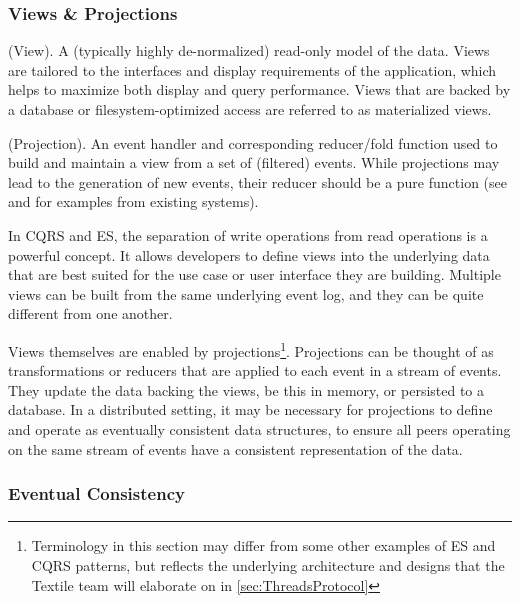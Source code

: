 \documentclass{textile}
\begin{document}
\subsubsection{Views \& Projections} \label{sec:ViewsProjections}

\begin{definition}  (View). A (typically highly de-normalized) read-only model of the data. Views are tailored to the interfaces and display requirements of the application, which helps to maximize both display and query performance. Views that are backed by a database or filesystem-optimized access are referred to as materialized views. \end{definition}

\begin{definition} (Projection). An event handler and corresponding reducer/fold function used to build and maintain a view from a set of (filtered) events. While projections may lead to the generation of new events, their reducer should be a pure function (see \cite{eventsourceEventSourcingBasics} and \cite{reduxGettingStartedRedux} for examples from existing systems). \end{definition}

In CQRS and ES, the separation of write operations from read operations is a powerful concept. It allows developers to define views into the underlying data that are best suited for the use case or user interface they are building. Multiple views can be built from the same underlying event log, and they can be quite different from one another.

Views themselves are enabled by projections\footnote{Terminology in this section may differ from some other examples of ES and CQRS patterns, but reflects the underlying architecture and designs that the Textile team will elaborate on in \ref{sec:ThreadsProtocol}}. Projections can be thought of as transformations or reducers that are applied to each event in a stream of events. They update the data backing the views, be this in memory, or persisted to a database. In a distributed setting, it may be necessary for projections to define and operate as eventually consistent data structures, to ensure all peers operating on the same stream of events have a consistent representation of the data.

\subsubsection{Eventual Consistency} \label{sec:EventualConsistency}
\end{document}
